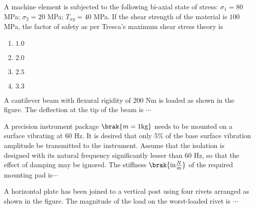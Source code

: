\iffalse
                       
                        
                        
                        
                    
                        \author{AI24BTECH11006 - Bugada Roopansha}
                        \section{me}
                        \chapter{2015}
                        \fi
 
    \item A machine element is subjected to the following bi-axial state of stress: $\sigma_1 = 80$ MPa; $\sigma_2 = 20$ MPa; $T_{xy} = 40$ MPa. If the shear strength of the material is $100$ MPa, the factor of safety as per Tresca's maximum shear stress theory is
    \begin{enumerate}
        \item $1.0$
        \item $2.0$
        \item $2.5$
        \item $3.3$
    \end{enumerate} 


    \item A cantilever beam with flexural rigidity of $200$ Nm is loaded as shown in the figure. The deflection  at the tip of the beam is $\cdots$



 \item A precision instrument package $\brak{m = 1 \text{kg}}$ needs to be mounted on a surface vibrating at $60$ Hz. It is desired that only $5\%$ of the base surface vibration amplitude be transmitted to the instrument. Assume that the isolation is designed with its natural frequency significantly lesser than $60$ Hz, so that the effect of damping may be ignored. The stiffness $\brak{\text{in}\frac{N}{m}}$ of the required mounting pad is$\cdots$

\item A horizontal plate has been joined to a vertical post using four rivets arranged as shown in the figure. The magnitude of the load on the worst-loaded rivet  is $\cdots$

